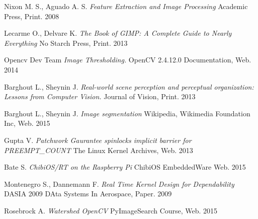 \documentclass[12pt,twoside,a4paper]{article}
\begin{document}
\begin{thebibliography}{9}
Nixon M. S., Aguado A. S.
\textit{Feature Extraction and Image Processing} Academic Press, Print. 2008

Lecarme  O., Delvare K.
\textit{The Book of GIMP: A Complete Guide to Nearly Everything} No Starch Press, Print. 2013

Opencv Dev Team
\textit{Image Thresholding.} OpenCV 2.4.12.0 Documentation, Web. 2014

Barghout L., Sheynin J.
\textit{Real-world scene perception and perceptual organization: Lessons from Computer Vision.} Journal of Vision, Print. 2013

Barghout L., Sheynin J.
\textit{Image segmentation} Wikipedia, Wikimedia Foundation Inc, Web. 2015

Gupta V.
\textit{Patchwork Gaurantee spinlocks implicit barrier for PREEMPT\_COUNT} The Linux Kernel Archives, Web. 2013

Bate S.
\textit{ChibiOS/RT on the Raspberry Pi} ChibiOS EmbeddedWare Web. 2015

Montenegro S., Dannemann F. 
\textit{Real Time Kernel Design for Dependability} DASIA 2009 DAta Systems In Aerospace, Paper. 2009

Rosebrock A.
\textit{Watershed OpenCV} PyImageSearch Course, Web. 2015

\end{thebibliography}
\end{document}
